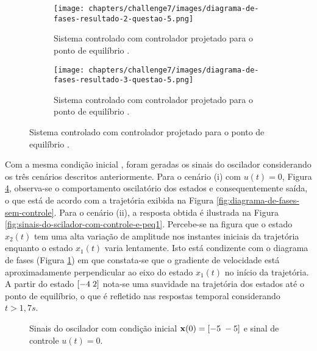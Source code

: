 \begin{figure}[H]
    \caption{Diagrama de fases considerando a condição inicial $[-5 \thickspace -5]^\top$ e
    com o controlador LQR.}
    \label{fig:diagrama-de-fases-com-controle}
    \centering
    \begin{subfigure}[t]{0.49\textwidth}
        \centering
	    \texttt{[image: chapters/challenge7/images/diagrama-de-fases-resultado-2-questao-5.png]}
        \caption{Sistema controlado com controlador projetado para o ponto de equilíbrio \peqone.}
        \label{fig:diagrama-de-fases-com-controle-ponto-de-equilibrio-1}
    \end{subfigure}
    \hfill
    \begin{subfigure}[t]{0.49\textwidth}
        \centering
	    \texttt{[image: chapters/challenge7/images/diagrama-de-fases-resultado-3-questao-5.png]}
        \caption{Sistema controlado com controlador projetado para o ponto de equilíbrio \peqtwo.}
        \label{fig:diagrama-de-fases-com-controle-ponto-de-equilibrio-2}
    \end{subfigure}
\end{figure}

Com a mesma condição inicial \inicond, foram geradas os sinais do oscilador
considerando os três cenários descritos anteriormente. Para o cenário (i) com
$u(t) = 0$, Figura \ref{fig:sinais-do-scilador-sem-controle}, observa-se o
comportamento oscilatório dos estados e consequentemente saída, o que está de
acordo com a trajetória exibida na Figura
\ref{fig:diagrama-de-fases-sem-controle}. Para o cenário (ii), a resposta obtida
é ilustrada na Figura \ref{fig:sinais-do-scilador-com-controle-e-peq1}.
Percebe-se na figura que o estado $x_2(t)$ tem uma alta variação de amplitude
nos instantes iniciais da trajetória enquanto o estado $x_1(t)$ varia
lentamente. Isto está condizente com o diagrama de fases (Figura
\ref{fig:diagrama-de-fases-com-controle-ponto-de-equilibrio-1}) em que
constata-se que o gradiente de velocidade está aproximadamente perpendicular ao
eixo do estado $x_1(t)$ no início da trajetória. A partir do estado $[-4
\thickspace 2]$ nota-se uma suavidade na trajetória dos estados até o ponto de
equilíbrio, o que é refletido nas respostas temporal considerando $t > 1,7s$.

\begin{figure}[H]
    \caption{Sinais do oscilador com condição inicial $\ssvec{x}(0) = [-5
    \thickspace -5]$ e sinal de controle $u(t)=0$.}
    \vspace{-10pt}
    \hspace{-30pt}
    \label{fig:sinais-do-scilador-sem-controle}
    \begin{minipage}{\linewidth}
        
    \end{minipage}
    \vspace{-10pt}
\end{figure}


